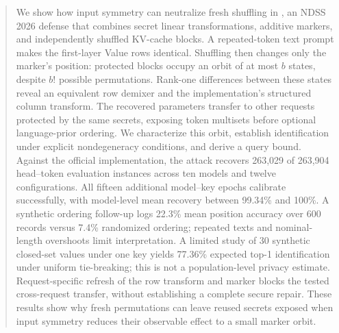 \begin{abstract}
We show how input symmetry can neutralize fresh shuffling in \scheme{}, an NDSS 2026 defense that combines secret linear transformations, additive markers, and independently shuffled KV-cache blocks. A repeated-token text prompt makes the first-layer Value rows identical. Shuffling then changes only the marker's position: protected blocks occupy an orbit of at most $b$ states, despite $b!$ possible permutations. Rank-one differences between these states reveal an equivalent row demixer and the implementation's structured column transform. The recovered parameters transfer to other requests protected by the same secrets, exposing token multisets before optional language-prior ordering. We characterize this orbit, establish identification under explicit nondegeneracy conditions, and derive a query bound. Against the official implementation, the attack recovers 263,029 of 263,904 head--token evaluation instances across ten models and twelve configurations. All fifteen additional model--key epochs calibrate successfully, with model-level mean recovery between 99.34\% and 100\%. A synthetic ordering follow-up logs 22.3\% mean position accuracy over 600 records versus 7.4\% randomized ordering; repeated texts and nominal-length overshoots limit interpretation. A limited study of 30 synthetic closed-set values under one key yields 77.36\% expected top-1 identification under uniform tie-breaking; this is not a population-level privacy estimate. Request-specific refresh of the row transform and marker blocks the tested cross-request transfer, without establishing a complete secure repair. These results show why fresh permutations can leave reused secrets exposed when input symmetry reduces their observable effect to a small marker orbit.
\end{abstract}
